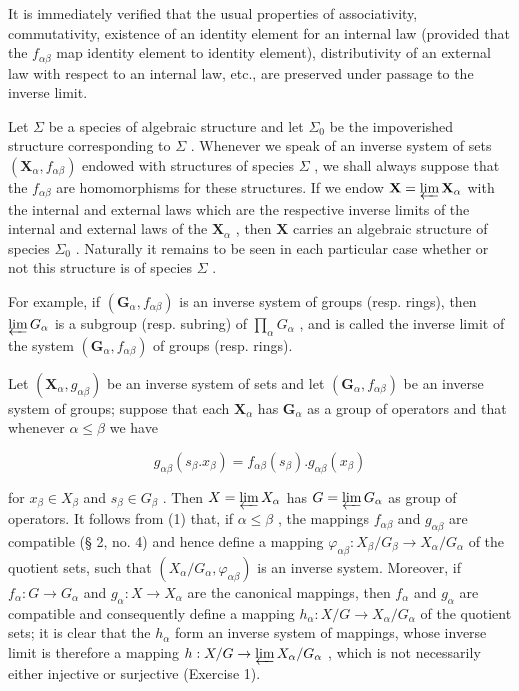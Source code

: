 It is immediately verified that the usual properties of associativity, commutativity, existence of an identity element for an internal law (provided that the \(f_{\alpha\beta}\) map identity element to identity element), distributivity of an external law with respect to an internal law, etc., are preserved under passage to the inverse limit.

Let \(\Sigma\) be a species of algebraic structure and let \(\Sigma_0\) be the impoverished structure corresponding to \(\Sigma\) . Whenever we speak of an inverse system of sets \((\mathbf{X}_{\alpha}, f_{\alpha\beta})\) endowed with structures of species \(\Sigma\) , we shall always suppose that the \(f_{\alpha\beta}\) are homomorphisms for these structures. If we endow \(\mathbf{X} = \varprojlim \mathbf{X}_{\alpha}\) with the internal and external laws which are the respective inverse limits of the internal and external laws of the \(\mathbf{X}_{\alpha}\) , then \(\mathbf{X}\) carries an algebraic structure of species \(\Sigma_0\) . Naturally it remains to be seen in each particular case whether or not this structure is of species \(\Sigma\) .

For example, if \((\mathbf{G}_{\alpha}, f_{\alpha\beta})\) is an inverse system of groups (resp. rings), then \(\varprojlim G_{\alpha}\) is a subgroup (resp. subring) of \(\prod_{\alpha} G_{\alpha}\) , and is called the inverse limit of the system \((\mathbf{G}_{\alpha}, f_{\alpha\beta})\) of groups (resp. rings).

Let \((\mathbf{X}_{\alpha}, g_{\alpha \beta})\) be an inverse system of sets and let \((\mathbf{G}_{\alpha}, f_{\alpha \beta})\) be an inverse system of groups; suppose that each \(\mathbf{X}_{\alpha}\) has \(\mathbf{G}_{\alpha}\) as a group of operators and that whenever \(\alpha \leqslant \beta\) we have

\[
g _ {\alpha \beta} (s _ {\beta}. x _ {\beta}) = f _ {\alpha \beta} (s _ {\beta}). g _ {\alpha \beta} (x _ {\beta})\tag{1}
\]

for \(x_{\beta} \in X_{\beta}\) and \(s_{\beta} \in G_{\beta}\) . Then \(X = \varprojlim X_{\alpha}\) has \(G = \varprojlim G_{\alpha}\) as group of operators. It follows from (1) that, if \(\alpha \leqslant \beta\) , the mappings \(f_{\alpha \beta}\) and \(g_{\alpha \beta}\) are compatible (§ 2, no. 4) and hence define a mapping \(\varphi_{\alpha \beta}: X_{\beta}/G_{\beta} \to X_{\alpha}/G_{\alpha}\) of the quotient sets, such that \((X_{\alpha}/G_{\alpha}, \varphi_{\alpha \beta})\) is an inverse system. Moreover, if \(f_{\alpha}: G \to G_{\alpha}\) and \(g_{\alpha}: X \to X_{\alpha}\) are the canonical mappings, then \(f_{\alpha}\) and \(g_{\alpha}\) are compatible and consequently define a mapping \(h_{\alpha}: X/G \to X_{\alpha}/G_{\alpha}\) of the quotient sets; it is clear that the \(h_{\alpha}\) form an inverse system of mappings, whose inverse limit is therefore a mapping \(h: X/G \to \varprojlim X_{\alpha}/G_{\alpha}\) , which is not necessarily either injective or surjective (Exercise 1).

